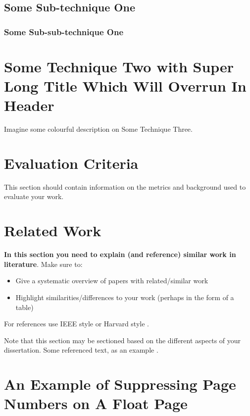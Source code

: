 \subsection{Some Sub-technique One}
\blindtext
{}
\blindtext
\subsubsection{Some Sub-sub-technique One}
\blindtext
{}
\blindtext
{}

\section[Some Technique Two]{Some Technique Two with Super Long Title Which Will Overrun In Header}
\blindtext[5]

Imagine some colourful description on Some Technique Three.


\section{Evaluation Criteria}
This section should contain information on the metrics and background used to evaluate your work.

\section{Related Work}
\textbf{In this section you need to explain (and reference) similar work in literature}.  Make sure to:

\begin{itemize}
 \item Give a systematic overview of papers with related/similar work
 \item Highlight similarities/differences to your work (perhaps in the form of a table)
\end{itemize}

For references use IEEE style \citep{IEEERefStyle} or Harvard style \citep{HarvRefStyle}.

Note that this section may be sectioned based on the different aspects of your dissertation.  Some referenced text, as an example \citep{Arrighi2003, WithersMartinez2012, Ebejer2016}.

\section{An Example of Suppressing Page Numbers on A Float Page}

